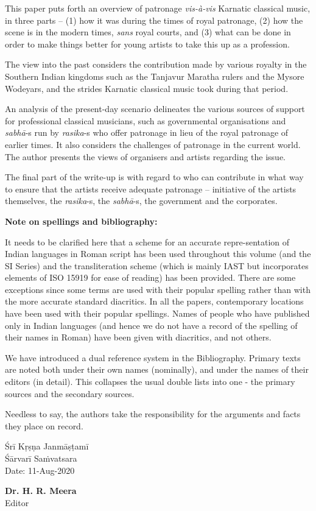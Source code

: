This paper puts forth an overview of patronage \textit{vis-à-vis} Karnatic classical music, in three parts – (1) how it was during the times of royal patronage, (2) how the scene is in the modern times, \textit{sans} royal courts, and (3) what can be done in order to make things better for young artists to take this up as a profession.

The view into the past considers the contribution made by various royalty in the Southern Indian kingdoms such as the Tanjavur Maratha rulers and the Mysore Wodeyars, and the strides Karnatic classical music took during that period.

An analysis of the present-day scenario delineates the various sources of support for professional classical musicians, such as governmental organisations and \textit{sabhā}-s run by \textit{rasika}-s who offer patronage in lieu of the royal patronage of earlier times. It also considers the challenges of patronage in the current world. The author presents the views of organisers and artists regarding the issue.

The final part of the write-up is with regard to who can contribute in what way to ensure that the artists receive adequate patronage – initiative of the artists themselves, the \textit{rasika}-s, the \textit{sabhā}-s, the government and the corporates.

\delimiter

\vspace{-.3cm}

\textbf{Note on spellings and bibliography: }

It needs to be clarified here that a scheme for an accurate repre-\break sentation of Indian languages in Roman script has been used throughout this volume (and the SI Series) and the transliteration scheme (which is mainly IAST but incorporates elements of ISO 15919 for ease of reading) has been provided. There are some exceptions since some terms are used with their popular spelling rather than with the more accurate standard diacritics. In all the papers, contemporary locations have been used with their popular spellings. Names of people who have published only in Indian languages (and hence we do not have a record of the spelling of their names in Roman) have been given with diacritics, and not others.

We have introduced a dual reference system in the Bibliography. Primary texts are noted both under their own names (nominally), and under the names of their editors (in detail). This collapses the usual double lists into one - the primary sources and the secondary sources.

Needless to say, the authors take the responsibility for the arguments and facts they place on record.

\vspace{.2cm}

Śrī Kṛṣṇa Janmāṣṭamī\\ Śārvarī Saṁvatsara\\ Date: 11-Aug-2020

\vspace{-1.83cm}

\begin{flushright}
\textbf{Dr. H. R. Meera}\\ Editor
\end{flushright}

\theendnotes

